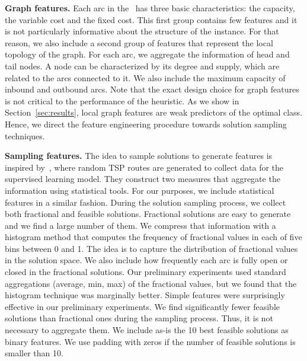 \documentclass[3p, authoryear, times, doubleblind]{elsarticle}
\begin{document}
{\textbf{Graph features. }  Each arc in the \fcn~has three basic characteristics: the capacity, the variable cost and the fixed cost. This first group contains few features and it is not particularly informative about the structure of the instance. For that reason, we also include a second group of features that represent the local topology of the graph. For each arc, we aggregate the information of head and tail nodes. A node can be characterized by its degree and supply, which are related to the  arcs connected to it. We also include the maximum capacity of inbound and outbound arcs.  Note that the exact design choice for graph features is not critical to the performance of the heuristic. As we show in Section~\ref{sec:results}, local graph features are weak predictors of the optimal class. Hence, we direct the feature engineering procedure towards solution sampling techniques. 


\textbf{Sampling features. } The idea to sample solutions to generate features is inspired by~\cite{sun_generalization_2021}, where random TSP routes are generated to collect data for the supervised learning model. They construct two measures that aggregate the information using statistical tools.  For our purposes, we include statistical features in a similar fashion. During the solution sampling process, we collect both fractional and feasible solutions. Fractional solutions are easy to generate and we find a large number of them. We compress that information with a histogram method that computes the frequency of fractional values in each of five bins between 0 and 1. The idea is to capture the distribution of fractional values in the solution space. We also include how frequently each arc is fully open or closed in the fractional solutions. Our preliminary experiments used standard aggregations (average, min, max) of the fractional values, but we found that the histogram technique was marginally better. Simple features were surprisingly effective in our preliminary experiments. We find significantly fewer feasible solutions than fractional ones during the sampling process. Thus, it is not necessary to aggregate them. We include as-is the 10 best feasible solutions as binary features.  We use padding with zeros if the number of feasible solutions is smaller than 10.
\stopblue  



}
\end{document}
